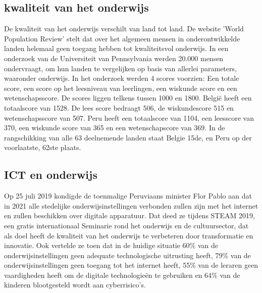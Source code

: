 \subsection{kwaliteit van het onderwijs}
De kwaliteit van het onderwijs verschilt van land tot land. \autocite{Review2020} De website 'World Population Review' stelt dat over het algemeen mensen in onderontwikkelde landen helemaal geen toegang hebben tot kwaliteitsvol onderwijs. 
In een onderzoek van de  Universiteit van Pennsylvania \autocite{UsNews2020} werden 20.000 mensen ondervraagt, om hun landen te vergelijken op basis van allerlei parameters, waaronder onderwijs. In het onderzoek werden 4 scores voorzien: Een totale score, een score op het leesniveau van leerlingen, een wiskunde score en een wetenschapsscore. De scores liggen telkens tussen 1000 en 1800. België heeft een totaalscore van 1528. De lees score bedraagt 506, de wiskundescore 515 en wetenschapsscore van 507. Peru heeft een totaalscore van 1104, een leesscore van 370, een wiskunde score van 365 en een wetenschapscore van 369. In de rangschikking van alle 63 deelnemende landen staat Belgie 15de, en Peru op der voorlaatste, 62ste plaats.




\subsection{ICT en onderwijs}
Op 25 juli 2019 kondigde de toenmalige Peruviaans minister Flor Pablo aan dat in 2021 alle stedelijke onderwijsinstellingen verbonden zullen zijn met het internet en zullen beschikken over digitale apparatuur. Dat deed ze tijdens STEAM 2019, een gratis internationaal Seminarie rond het onderwijs en de cultuursector, dat als doel heeft de kwaliteit van het onderwijs te verbeteren door transformatie en innovatie. Ook vertelde ze toen dat in de huidige situatie 60\% van de onderwijsinstellingen geen adequate technologische uitrusting heeft, 79\% van de onderwijsinstellingen geen toegang tot het internet heeft, 55\% van de leraren geen vaardigheden heeft om de digitale technologieën te gebruiken en 64\% van de kinderen blootgesteld wordt aan cyberrisico's. \autocite{Ministerio de Educación}

